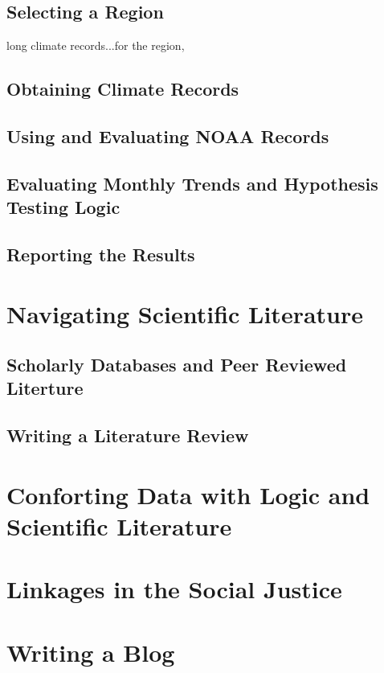\documentclass{tufte-handout}\usepackage[]{graphicx}\usepackage[]{color}
\begin{document}
\subsection{Selecting a Region}

long climate records...for the region, 

\subsection{Obtaining Climate Records}

\subsection{Using and Evaluating NOAA Records}

\subsection{Evaluating Monthly Trends and Hypothesis Testing Logic}

\subsection{Reporting the Results}


\section{Navigating Scientific Literature}

\subsection{Scholarly Databases and Peer Reviewed Literture}

\subsection{Writing a Literature Review}

\section{Conforting Data with Logic and Scientific Literature}

\section{Linkages in the Social Justice}


\section{Writing a Blog}
\end{document}
